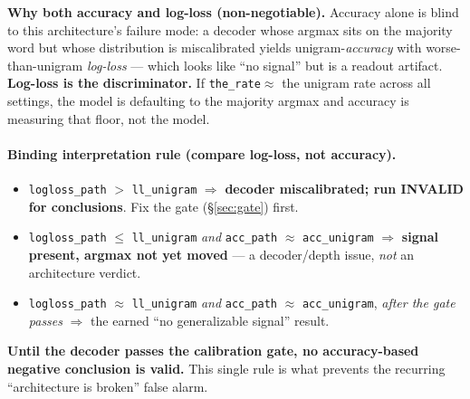 \documentclass[11pt]{article}
\newcommand{\code}[1]{\texttt{#1}}
\begin{document}
\noindent\textbf{Why both accuracy and log-loss (non-negotiable).} Accuracy alone is blind to this architecture's failure mode: a decoder whose argmax sits on the majority word but whose distribution is miscalibrated yields unigram-\emph{accuracy} with worse-than-unigram \emph{log-loss} --- which looks like ``no signal'' but is a readout artifact. \textbf{Log-loss is the discriminator.} If \code{the\_rate}$\approx$ the unigram rate across all settings, the model is defaulting to the majority argmax and accuracy is measuring that floor, not the model.

\paragraph{Binding interpretation rule (compare log-loss, not accuracy).}
\begin{itemize}[nosep]
\item \code{logloss\_path} $>$ \code{ll\_unigram} $\Rightarrow$ \textbf{decoder miscalibrated; run INVALID for conclusions}. Fix the gate (\S\ref{sec:gate}) first.
\item \code{logloss\_path} $\le$ \code{ll\_unigram} \emph{and} \code{acc\_path} $\approx$ \code{acc\_unigram} $\Rightarrow$ \textbf{signal present, argmax not yet moved} --- a decoder/depth issue, \emph{not} an architecture verdict.
\item \code{logloss\_path} $\approx$ \code{ll\_unigram} \emph{and} \code{acc\_path} $\approx$ \code{acc\_unigram}, \emph{after the gate passes} $\Rightarrow$ the earned ``no generalizable signal'' result.
\end{itemize}
\textbf{Until the decoder passes the calibration gate, no accuracy-based negative conclusion is valid.} This single rule is what prevents the recurring ``architecture is broken'' false alarm.
\end{document}
